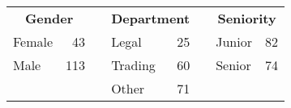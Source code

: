 
\begin{tabular}{lrclrclr}
    \toprule
    \multicolumn{2}{c}{\textbf{Gender}}
    & & \multicolumn{2}{c}{\textbf{Department}}
    & & \multicolumn{2}{c}{\textbf{Seniority}} \\
    \cmidrule{1-2} \cmidrule{4-5} \cmidrule{7-8}
    Female&43&&Legal&25&&Junior&82\\
    Male&113&&Trading&60&&Senior&74\\
    &&&Other&71&&&\\
    \bottomrule
\end{tabular}
